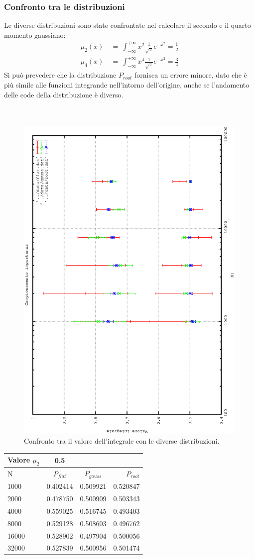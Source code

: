 \subsubsection{Confronto tra le distribuzioni}
Le diverse distribuzioni sono state confrontate nel calcolare il secondo e il quarto momento gaussiano:
\begin{align*}
\mu_2(x) \ &= \ \int_{-\infty}^{+\infty} x^2 \frac{1}{\sqrt{\pi}} e^{-x^2}  = \frac{1}{2}\\
\mu_4(x) \ &= \ \int_{-\infty}^{+\infty} x^4  \frac{1}{\sqrt{\pi}} e^{-x^2} = \frac{3}{4}
\end{align*}
Si può prevedere che la distribuzione $P_{root}$ fornisca un errore minore, dato che è più simile alle funzioni integrande nell'intorno dell'origine,
anche se l'andamento delle code della distribuzione è diverso.\\ \\ \\

\begin{figure}[h]
\centering
\includegraphics[width=0.6\columnwidth,angle=-90]{importanza_integrale.eps}
\caption{\small{Confronto tra il valore dell'integrale con le diverse distribuzioni.}}
\end{figure}
\begin{center}
 \begin{longtable}[htb]{lccr}
  \toprule
  Valore $\mu_2$ & 0.5 & & \\
  \midrule
  N & $P_{flat}$ & $P_{gauss} $  & $P_{root}$ \\
  \midrule
1000   & 0.402414	& 0.509921 	& 0.520847  \\
2000   & 0.478750	& 0.500909 	& 0.503343 \\
4000   & 0.559025	& 0.516745 	& 0.493403 \\
8000   & 0.529128	& 0.508603 	& 0.496762 \\
16000  & 0.528902	& 0.497904 	& 0.500056 \\
32000  & 0.527839	& 0.500956 	& 0.501474 \\
  \bottomrule
  \end{longtable}
\end{center}

